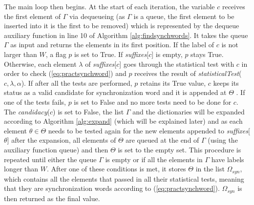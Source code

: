 {The main loop then begins. At the start of each iteration, the variable $c$ receives the first element of $\Gamma$ via dequeueing (as $\Gamma$ is a queue, the first element to be inserted into it is the first to be removed) which is represented by the dequeue auxiliary function in line 10 of Algorithm \ref{alg:findsynchwords}. It takes the queue $\Gamma$ as input and returns the elements in its first position. If the label of $c$ is not larger than $W$, a flag $p$ is set to True. If \textit{suffixes}[$c$] is empty, $p$ stays True. Otherwise, each element $\lambda$ of \textit{suffixes}[$c$] goes through the statistical test with $c$ in order to check (\ref{eq:practsynchword}) and $p$ receives the result of \textit{statisticalTest}($c, \lambda, \alpha$). If after all the tests are performed, $p$ retains its True value, $c$ keeps its status as a valid candidate for synchronization word and it is appended at $\Theta$ . If one of the tests fails, $p$ is set to False and no more tests need to be done for $c$. The \textit{candidacy}($c$) is set to False, the list $\Gamma$ and the dictionaries will be expanded according to Algorithm \ref{alg:expand} (which will be explained later) and as each element $\theta \in \Theta$ needs to be tested again for the new elements appended to \textit{suffixes}[$\theta$] after the expansion, all elements of $\Theta$ are queued at the end of $\Gamma$ (using the auxiliary function queue) and then $\Theta$ is set to the empty set. This procedure is repeated until either the queue $\Gamma$ is empty or if all the elements in $\Gamma$ have labels longer than $W$. After one of these conditions is met, it stores $\Theta$ in the list $\Omega_{syn}$, which contains all the elements that passed in all their statistical tests, meaning that they are synchronization words according to (\ref{eq:practsynchword}). $\Omega_{syn}$ is then returned as the final value. 

}
